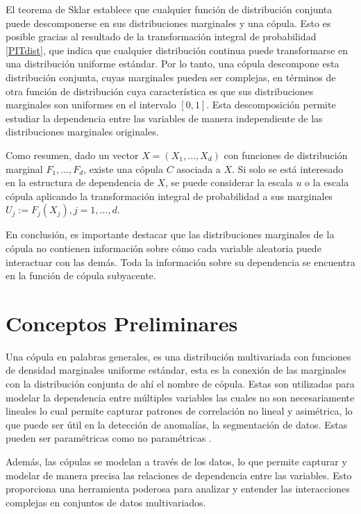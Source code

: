 El teorema de Sklar establece que cualquier función de distribución conjunta puede descomponerse en sus distribuciones marginales y una cópula. Esto es posible gracias al resultado de la transformación integral de probabilidad \eqref{PITdist}, que indica que cualquier distribución continua puede transformarse en una distribución uniforme estándar. Por lo tanto, una cópula descompone esta distribución conjunta, cuyas marginales pueden ser complejas, en términos de otra función de distribución cuya característica es que sus distribuciones marginales son uniformes en el intervalo $[0,1]$. Esta descomposición permite estudiar la dependencia entre las variables de manera independiente de las distribuciones marginales originales.

Como resumen, dado un vector $X = (X_1, \dots, X_d)$ con funciones de distribución marginal $F_1, \dots, F_d$, existe una cópula $C$ asociada a $X$. Si solo se está interesado en la estructura de dependencia de $X$, se puede considerar la escala $u$ o la escala cópula aplicando la transformación integral de probabilidad a sus marginales $U_j := F_j(X_j), j = 1, \dots, d$.

En conclusión, es importante destacar que las distribuciones marginales de la cópula no contienen información sobre cómo cada variable aleatoria puede interactuar con las demás. Toda la información sobre su dependencia se encuentra en la función de cópula subyacente.

\section{Conceptos Preliminares}

Una cópula en palabras generales, es una distribución multivariada con funciones de densidad marginales uniforme estándar, esta es la conexión de las marginales con la distribución conjunta de ahí el nombre de cópula. Estas son utilizadas para modelar la dependencia entre múltiples variables las cuales no son necesariamente lineales lo cual permite capturar patrones de correlación no lineal y asimétrica, lo que puede ser útil en la detección de anomalías, la segmentación de datos. Estas pueden ser paramétricas como no paramétricas \cite{CopulasR}.

Además, las cópulas se modelan a través de los datos, lo que permite capturar y modelar de manera precisa las relaciones de dependencia entre las variables. Esto proporciona una herramienta poderosa para analizar y entender las interacciones complejas en conjuntos de datos multivariados.


